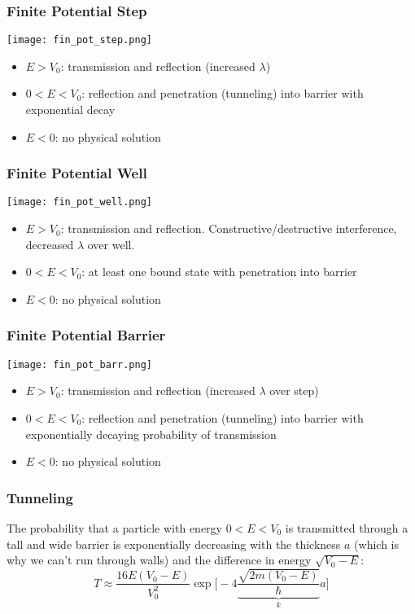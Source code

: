 \subsubsection{Finite Potential Step}
\begin{center}
    \texttt{[image: fin\_pot\_step.png]}
\end{center}
\begin{itemize}
    \item $E>V_0$: transmission and reflection (increased $\lambda$)
    \item $0<E<V_0$: reflection and penetration (tunneling) into barrier with exponential decay
    \item $E<0$: no physical solution
\end{itemize}

\subsubsection{Finite Potential Well}
\begin{center}
    \texttt{[image: fin\_pot\_well.png]}
\end{center}
\begin{itemize}
    \item $E>V_0$: transmission and reflection. Constructive/destructive interference, decreased $\lambda$ over well.
    \item $0<E<V_0$: at least one bound state with penetration into barrier
    \item $E<0$: no physical solution
\end{itemize}

\subsubsection{Finite Potential Barrier}
\begin{center}
    \texttt{[image: fin\_pot\_barr.png]}
\end{center}
\begin{itemize}
    \item $E>V_0$: transmission and reflection (increased $\lambda$ over step)
    \item $0<E<V_0$: reflection and penetration (tunneling) into barrier with exponentially decaying probability of transmission
    \item $E<0$: no physical solution
\end{itemize}

\subsubsection{Tunneling}
The probability that a particle with energy $0<E<V_0$ is transmitted through a tall and wide barrier is exponentially decreasing with the thickness $a$ (which is why we can't run through walls) and the difference in energy $\sqrt{V_0-E}$:
\noindent\begin{equation*}
    T\approx\frac{16E(V_0-E)}{V_0^2}\exp\Biggl[-4 \underbrace{\frac{\sqrt{2m(V_0-E)}}{\hbar}}_{k} a\Biggr]
\end{equation*}